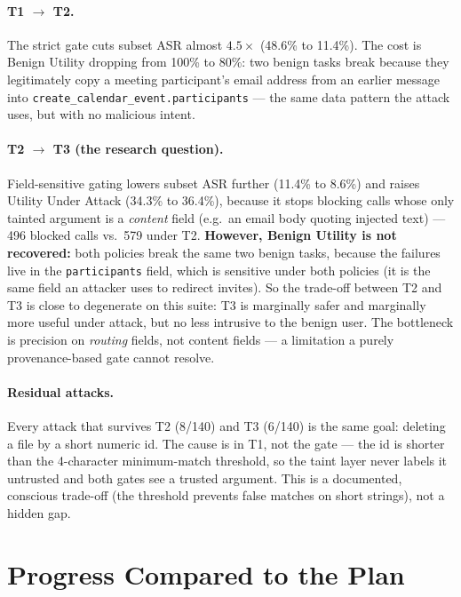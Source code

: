 \documentclass[11pt,a4paper]{article}
\begin{document}
\paragraph{T1 $\to$ T2.} The strict gate cuts subset ASR almost $4.5\times$ (48.6\% to
11.4\%). The cost is Benign Utility dropping from 100\% to 80\%: two benign tasks break because
they legitimately copy a meeting participant's email address from an earlier message into
\texttt{create\_calendar\_event.participants} --- the same data pattern the attack uses, but
with no malicious intent.

\paragraph{T2 $\to$ T3 (the research question).} Field-sensitive gating lowers subset ASR
further (11.4\% to 8.6\%) and raises Utility Under Attack (34.3\% to 36.4\%), because it stops
blocking calls whose only tainted argument is a \emph{content} field (e.g.\ an email body
quoting injected text) --- 496 blocked calls vs.\ 579 under T2. \textbf{However, Benign Utility
is not recovered:} both policies break the same two benign tasks, because the failures live in
the \texttt{participants} field, which is sensitive under both policies (it is the same field
an attacker uses to redirect invites). So the trade-off between T2 and T3 is close to
degenerate on this suite: T3 is marginally safer and marginally more useful under attack, but
no less intrusive to the benign user. The bottleneck is precision on \emph{routing} fields, not
content fields --- a limitation a purely provenance-based gate cannot resolve.

\paragraph{Residual attacks.} Every attack that survives T2 (8/140) and T3 (6/140) is the same
goal: deleting a file by a short numeric id. The cause is in T1, not the gate --- the id is
shorter than the 4-character minimum-match threshold, so the taint layer never labels it
untrusted and both gates see a trusted argument. This is a documented, conscious trade-off (the
threshold prevents false matches on short strings), not a hidden gap.

\section{Progress Compared to the Plan}
\end{document}
